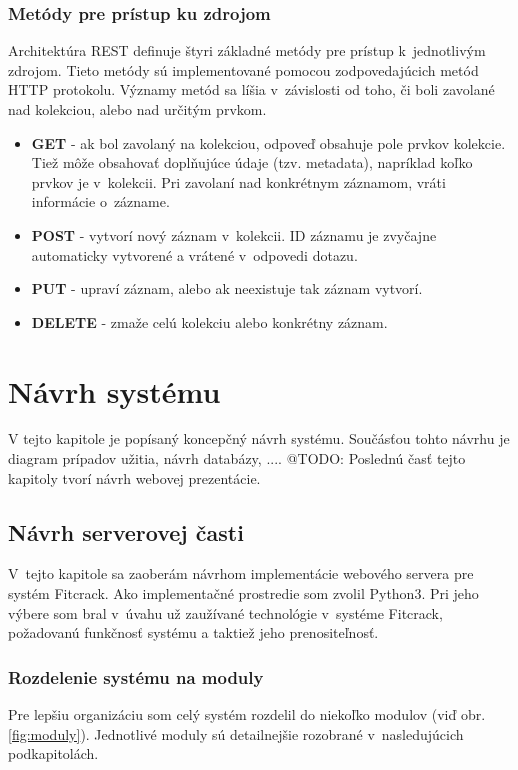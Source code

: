 \documentclass[slovak]{fitthesis}
\begin{document}
\subsection{Metódy pre prístup ku zdrojom}\label{httpMetody}
Architektúra REST definuje štyri základné metódy pre prístup k~jednotlivým zdrojom. Tieto metódy sú implementované pomocou zodpovedajúcich metód HTTP protokolu. Významy metód sa líšia v~závislosti od toho, či boli zavolané nad kolekciou, alebo nad určitým prvkom.
\begin{itemize}
    \item \textbf{GET} - ak bol zavolaný na kolekciou, odpoveď obsahuje pole prvkov kolekcie. Tiež môže obsahovať doplňujúce údaje (tzv. metadata), napríklad koľko prvkov je v~kolekcii.
    Pri zavolaní nad konkrétnym záznamom, vráti informácie o~zázname.
    \item \textbf{POST} - vytvorí nový záznam v~kolekcii. ID záznamu je zvyčajne automaticky vytvorené a vrátené v~odpovedi dotazu.
    \item \textbf{PUT} - upraví záznam, alebo ak neexistuje tak záznam vytvorí.
    \item \textbf{DELETE} - zmaže celú kolekciu alebo konkrétny záznam.
\end{itemize}



\chapter{Návrh systému}\label{navrh}
V tejto kapitole je popísaný koncepčný návrh systému. Součásťou tohto návrhu je
diagram prípadov užitia, návrh databázy, ....
@TODO:
Poslednú časť tejto kapitoly tvorí návrh webovej prezentácie.


\section{Návrh serverovej časti}\label{navrhServer}
V~tejto kapitole sa zaoberám návrhom implementácie webového servera pre systém Fitcrack. Ako implementačné prostredie som zvolil Python3. Pri jeho výbere som bral v~úvahu už zaužívané technológie v~systéme Fitcrack, požadovanú funkčnosť systému a taktiež jeho prenositeľnosť.

\subsection{Rozdelenie systému na moduly}
Pre lepšiu organizáciu som celý systém rozdelil do niekoľko modulov (viď obr. \ref{fig:moduly}). Jednotlivé moduly sú detailnejšie rozobrané v~nasledujúcich podkapitolách. 
\end{document}
